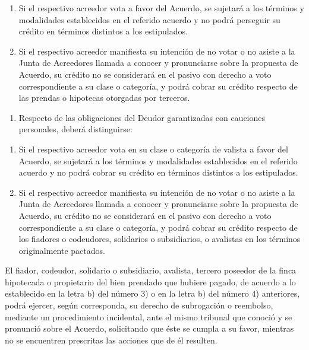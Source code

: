 \documentclass[
]{book}
\providecommand{\tightlist}{%
  \setlength{\itemsep}{0pt}\setlength{\parskip}{0pt}}
\begin{document}
\begin{enumerate}
\def\labelenumi{\alph{enumi})}
\item
  Si el respectivo acreedor vota a favor del Acuerdo, se sujetará a los términos y modalidades establecidos en el referido acuerdo y no podrá perseguir su crédito en términos distintos a los estipulados.
\item
  Si el respectivo acreedor manifiesta su intención de no votar o no asiste a la Junta de Acreedores llamada a conocer y pronunciarse sobre la propuesta de Acuerdo, su crédito no se considerará en el pasivo con derecho a voto correspondiente a su clase o categoría, y podrá cobrar su crédito respecto de las prendas o hipotecas otorgadas por terceros.
\end{enumerate}

\begin{enumerate}
\def\labelenumi{\arabic{enumi}.}
\setcounter{enumi}{3}
\tightlist
\item
  Respecto de las obligaciones del Deudor garantizadas con cauciones personales, deberá distinguirse:
\end{enumerate}

\begin{enumerate}
\def\labelenumi{\alph{enumi})}
\item
  Si el respectivo acreedor vota en su clase o categoría de valista a favor del Acuerdo, se sujetará a los términos y modalidades establecidos en el referido acuerdo y no podrá cobrar su crédito en términos distintos a los estipulados.
\item
  Si el respectivo acreedor manifiesta su intención de no votar o no asiste a la Junta de Acreedores llamada a conocer y pronunciarse sobre la propuesta de Acuerdo, su crédito no se considerará en el pasivo con derecho a voto correspondiente a su clase o categoría, y podrá cobrar su crédito respecto de los fiadores o codeudores, solidarios o subsidiarios, o avalistas en los términos originalmente pactados.
\end{enumerate}

El fiador, codeudor, solidario o subsidiario, avalista, tercero poseedor de la finca hipotecada o propietario del bien prendado que hubiere pagado, de acuerdo a lo establecido en la letra b) del número 3) o en la letra b) del número 4) anteriores, podrá ejercer, según corresponda, su derecho de subrogación o reembolso, mediante un procedimiento incidental, ante el mismo tribunal que conoció y se pronunció sobre el Acuerdo, solicitando que éste se cumpla a su favor, mientras no se encuentren prescritas las acciones que de él resulten.
\end{document}
